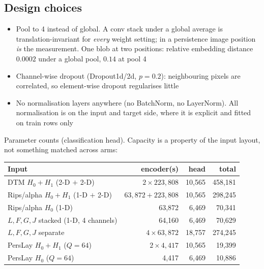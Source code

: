 \documentclass[11pt]{article}
\begin{document}
\subsection*{Design choices}
\begin{itemize}
  \item Pool to 4 instead of global. A conv stack under a global average is translation-invariant for \emph{every} weight setting; in a persistence image position \emph{is} the measurement. One blob at two positions: relative embedding distance $0.0002$ under a global pool, $0.14$ at pool 4
  \item Channel-wise dropout (Dropout1d/2d, $p=0.2$): neighbouring pixels are correlated, so element-wise dropout regularises little
  \item No normalisation layers anywhere (no BatchNorm, no LayerNorm). All normalisation is on the input and target side, where it is explicit and fitted on train rows only
\end{itemize}

\smallskip
Parameter counts (classification head). Capacity is a property of the input layout, not something matched across arms:

\smallskip
\begin{tabular}{@{}lrrr@{}}
\toprule
Input & encoder(s) & head & total \\
\midrule
DTM $H_0{+}H_1$ (2-D $+$ 2-D)          & $2\times223{,}808$ & 10{,}565 & 458{,}181 \\
Rips/alpha $H_0{+}H_1$ (1-D $+$ 2-D)   & $63{,}872 + 223{,}808$ & 10{,}565 & 298{,}245 \\
Rips/alpha $H_0$ (1-D)                 & 63{,}872 & 6{,}469 & 70{,}341 \\
$L,F,G,J$ stacked (1-D, 4 channels)    & 64{,}160 & 6{,}469 & 70{,}629 \\
$L,F,G,J$ separate                     & $4\times63{,}872$ & 18{,}757 & 274{,}245 \\
PersLay $H_0{+}H_1$ ($Q=64$)           & $2\times4{,}417$ & 10{,}565 & 19{,}399 \\
PersLay $H_0$ ($Q=64$)                 & 4{,}417 & 6{,}469 & 10{,}886 \\
\bottomrule
\end{tabular}

\end{document}
